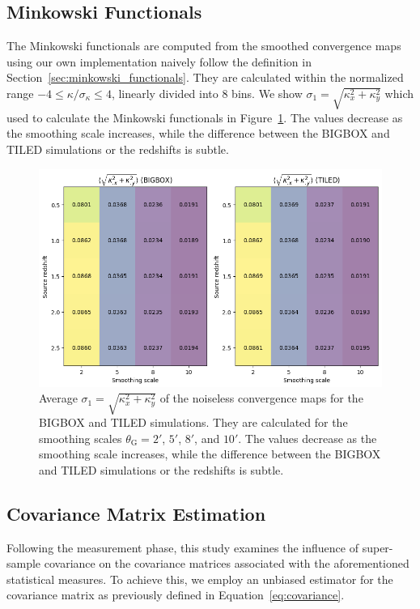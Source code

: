\subsection{Minkowski Functionals}
The Minkowski functionals are computed from the smoothed convergence maps using our own implementation naively follow the definition in Section~\ref{sec:minkowski_functionals}. They are calculated within the normalized range $-4 \leq \kappa/\sigma_{\kappa} \leq 4$, linearly divided into 8 bins. We show $\sigma_1 = \sqrt{\kappa_{x}^2 + \kappa_{y}^2}$ which used to calculate the Minkowski functionals in Figure~\ref{fig:avg_sigma1}. The values decrease as the smoothing scale increases, while the difference between the BIGBOX and TILED simulations or the redshifts is subtle.

\begin{figure}[ht]
    \centering
    \includegraphics[width=\textwidth]{figures/avg_sigma1.png}
    \caption{Average $\sigma_1 = \sqrt{\kappa_{x}^2 + \kappa_{y}^2}$ of the noiseless convergence maps for the BIGBOX and TILED simulations. They are calculated for the smoothing scales $\theta_{\mathrm{G}} = 2'$, $5'$, $8'$, and $10'$. The values decrease as the smoothing scale increases, while the difference between the BIGBOX and TILED simulations or the redshifts is subtle.
    } \label{fig:avg_sigma1}
\end{figure}

\subsection{Covariance Matrix Estimation}
Following the measurement phase, this study examines the influence of super-sample covariance on the covariance matrices associated with the aforementioned statistical measures. To achieve this, we employ an unbiased estimator for the covariance matrix as previously defined in Equation~\ref{eq:covariance}. 

